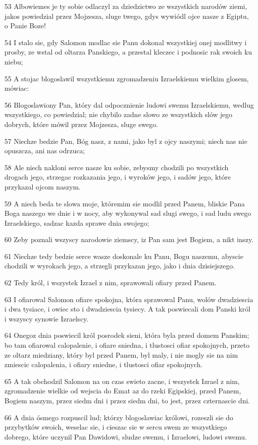 \par 53 Albowiemes je ty sobie odlaczyl za dziedzictwo ze wszystkich narodów ziemi, jakos powiedzial przez Mojzesza, sluge twego, gdys wywiódl ojce nasze z Egiptu, o Panie Boze!
\par 54 I stalo sie, gdy Salomon modlac sie Panu dokonal wszystkiej onej modlitwy i prosby, ze wstal od oltarza Panskiego, a przestal kleczec i podnosic rak swoich ku niebu;
\par 55 A stojac blogoslawil wszystkiemu zgromadzeniu Izraelskiemu wielkim glosem, mówiac:
\par 56 Blogoslawiony Pan, który dal odpocznienie ludowi swemu Izraelskiemu, wedlug wszystkiego, co powiedzial; nie chybilo zadne slowo ze wszystkich slów jego dobrych, które mówil przez Mojzesza, sluge swego.
\par 57 Niechze bedzie Pan, Bóg nasz, z nami, jako byl z ojcy naszymi; niech nas nie opuszcza, ani nas odrzuca;
\par 58 Ale niech nakloni serce nasze ku sobie, zebysmy chodzili po wszystkich drogach jego, strzegac rozkazania jego, i wyroków jego, i sadów jego, które przykazal ojcom naszym.
\par 59 A niech beda te slowa moje, któremim sie modlil przed Panem, bliskie Pana Boga naszego we dnie i w nocy, aby wykonywal sad slugi swego, i sad ludu swego Izraelskiego, sadzac kazda sprawe dnia swojego;
\par 60 Zeby poznali wszyscy narodowie ziemscy, iz Pan sam jest Bogiem, a nikt inszy.
\par 61 Niechze tedy bedzie serce wasze doskonale ku Panu, Bogu naszemu, abyscie chodzili w wyrokach jego, a strzegli przykazan jego, jako i dnia dzisiejszego.
\par 62 Tedy król, i wszystek Izrael z nim, sprawowali ofiary przed Panem.
\par 63 I ofiarowal Salomon ofiare spokojna, która sprawowal Panu, wolów dwadziescia i dwa tysiace, i owiec sto i dwadziescia tysiecy. A tak poswiecali dom Panski król i wszyscy synowie Izraelscy.
\par 64 Onegoz dnia poswiecil król posrodek sieni, która byla przed domem Panskim; bo tam ofiarowal calopalenie, i ofiare sniedna, i tlustosci ofiar spokojnych, przeto ze oltarz miedziany, który byl przed Panem, byl maly, i nie mogly sie na nim zmiescic calopalenia, i ofiary sniedne, i tlustosci ofiar spokojnych.
\par 65 A tak obchodzil Salomon na on czas swieto zacne, i wszystek Izrael z nim, zgromadzenie wielkie od wejscia do Emat az do rzeki Egipskiej, przed Panem, Bogiem naszym, przez siedm dni i przez siedm dni, to jest, przez czternascie dni.
\par 66 A dnia ósmego rozpuscil lud; którzy blogoslawiac królowi, rozeszli sie do przybytków swoich, weselac sie, i cieszac sie w sercu swem ze wszystkiego dobrego, które uczynil Pan Dawidowi, sludze swemu, i Izraelowi, ludowi swemu.

